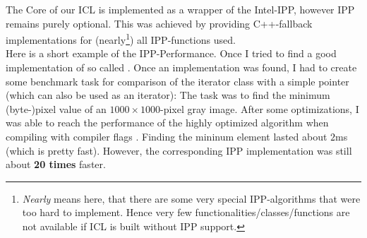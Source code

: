 \begin{enumerate}
The Core of our ICL is implemented as a wrapper of the Intel-IPP, however IPP remains purely optional. This was achieved by providing C++-fallback implementations for (nearly\footnote{\emph{Nearly} means here, that there are some very special IPP-algorithms that were too hard to implement. Hence very few functionalities/classes/functions are not available if ICL is built without IPP support.}) all IPP-functions used. \\
Here is a short example of the IPP-Performance. Once I tried to find a good implementation of so called . Once an implementation was found, I had to create some benchmark task for comparison of the iterator class with a simple pointer (which can also be used as an iterator): The task was to find the minimum (byte-)pixel value of an $1000\times{}1000$-pixel gray image. After some optimizations, I was able to reach the performance of the highly optimized  algorithm when compiling with compiler flags . Finding the mininum element lasted about $2$ms (which is pretty fast). However, the corresponding IPP implementation was still about \textbf{20 times} faster.
\end{enumerate}

